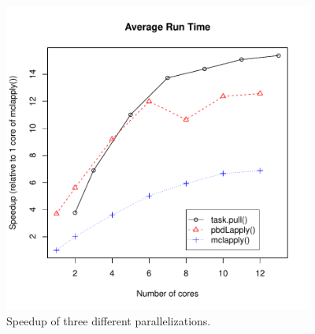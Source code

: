 \begin{figure}[ht]
\centering
\includegraphics[width=4in]{cubfits-include/figure/avg_run_time}
\caption{Speedup of three different parallelizations.}
\label{fig:speedup}
\end{figure}
